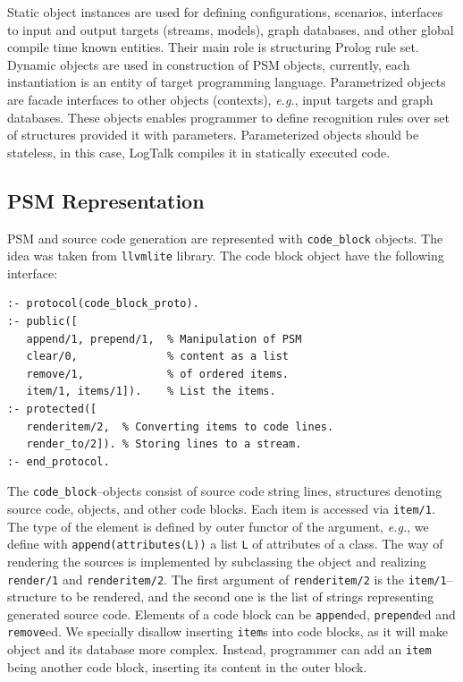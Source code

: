 \documentclass[conference]{IEEEtran}
\begin{document}
Static object instances are used for defining configurations, scenarios, interfaces to input and output targets (streams, models), graph databases, and other global compile time known entities.  Their main role is structuring Prolog rule set.  Dynamic objects are used in construction of PSM objects, currently, each instantiation is an entity of target programming language.  Parametrized objects are facade interfaces to other objects (contexts), \emph{e.g.}, input targets and graph databases.  These objects enables programmer to define recognition rules over set of structures provided it with parameters.  Parameterized objects should be stateless, in this case, LogTalk compiles it in statically executed code.



\subsection{PSM Representation}
\label{sec:blocks}

PSM and source code generation are represented with \texttt{code\_block} objects. The idea was taken from \verb|llvmlite| library.  The code block object have the following interface:
\begin{verbatim}
:- protocol(code_block_proto).
:- public([
   append/1, prepend/1,  % Manipulation of PSM
   clear/0,              % content as a list
   remove/1,             % of ordered items.
   item/1, items/1]).    % List the items.
:- protected([
   renderitem/2,  % Converting items to code lines.
   render_to/2]). % Storing lines to a stream.
:- end_protocol.
\end{verbatim}

The \verb|code_block|--objects consist of source code string lines, structures denoting source code, objects, and other code blocks. Each item is accessed via \verb|item/1|.  The type of the element is defined by outer functor of the argument, \emph{e.g.}, we define with \verb|append(attributes(L))| a list \verb|L| of attributes of a class.  The way of rendering the sources is implemented by subclassing the object and realizing \verb|render/1| and \verb|renderitem/2|.  The first argument of \verb|renderitem/2| is the \verb|item/1|--structure to be rendered, and the second one is the list of strings representing generated source code.  Elements of a code block can be \verb|append|ed, \verb|prepend|ed and \verb|remove|ed.  We specially disallow inserting \verb|item|s into code blocks, as it will make object and its database more complex.  Instead, programmer can add an \verb|item| being another code block, inserting its content in the outer block.
\end{document}
